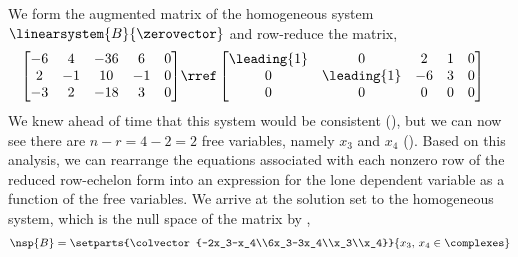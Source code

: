 We form the augmented matrix of the homogeneous system $\linearsystem{B}{\zerovector}$ and row-reduce the matrix,
%
\begin{align*}
\begin{bmatrix}
 -6 & 4 & -36 & 6 & 0 \\
 2 & -1 & 10 & -1 & 0 \\
 -3 & 2 & -18 & 3 & 0
\end{bmatrix}
&\rref
\begin{bmatrix}
 \leading{1} & 0 & 2 & 1 & 0 \\
 0 & \leading{1} & -6 & 3 & 0 \\
 0 & 0 & 0 & 0 & 0
\end{bmatrix}
\end{align*}
%
We knew ahead of time that this system would be consistent (), but we can now see there are $n-r=4-2=2$ free variables, namely $x_3$ and $x_4$ ().  Based on this analysis, we can rearrange the equations associated with each nonzero row of the reduced row-echelon form into an expression for the lone dependent variable as a function of the free variables.  We arrive at the solution set to the homogeneous system, which is the null space of the matrix by ,
%
\begin{align*}
\nsp{B}=\setparts{\colvector{-2x_3-x_4\\6x_3-3x_4\\x_3\\x_4}}{x_3,\,x_4\in\complexes}
\end{align*}
%
